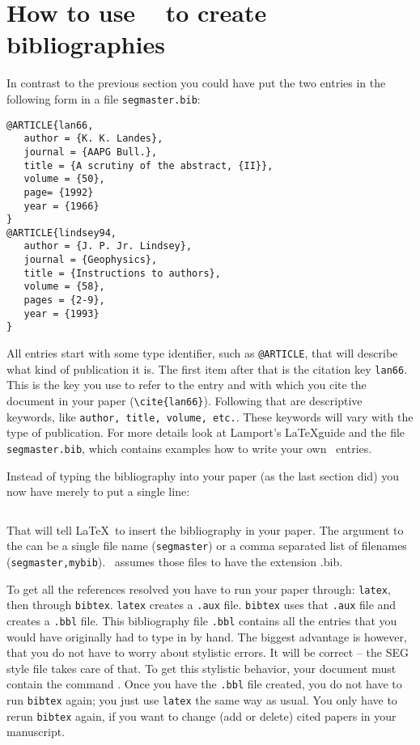 \section{How to use {{\BibTeX\ }} to create bibliographies}

In contrast to the previous section you could have put the two entries
in the following form in a file {\tt segmaster.bib}:
{\tighten
\begin{verbatim}
@ARTICLE{lan66,
   author = {K. K. Landes},
   journal = {AAPG Bull.},
   title = {A scrutiny of the abstract, {II}},
   volume = {50},
   page= {1992}
   year = {1966}
}
@ARTICLE{lindsey94,
   author = {J. P. Jr. Lindsey},
   journal = {Geophysics},
   title = {Instructions to authors},
   volume = {58},
   pages = {2-9},
   year = {1993}
}
\end{verbatim}
}
All entries start with some type identifier, such as {\tt @ARTICLE}, that
will describe what kind of publication it is. The first item after that
is the citation key {\tt lan66}. This is the key you use to refer to the
entry and with which you cite the document in your paper (\verb+\cite{lan66}+).
Following that are descriptive keywords, like {\tt author, title, 
volume, etc.}.
These keywords will vary with the type of publication.
For more details look at Lamport's \LaTeX guide  and the
file {\tt segmaster.bib}, which contains examples how to write your own 
\BibTeX\ entries.

Instead of typing the bibliography into your paper (as the last section did)
you now have merely to put a single line:
{\bf
\begin{verbatim}

\end{verbatim}
}
That will tell \LaTeX\ to  insert the bibliography in your paper.
The argument to the {\bf \verb++} 
can be a single file name
({\tt segmaster}) or a comma separated list of 
filenames ({\tt segmaster,mybib}).
\BibTeX\  assumes those files to have the extension {.bib}.

To get all the references resolved  you have to run your paper through:
{\tt latex}, then through {\tt bibtex}. 
{\tt latex} creates a {\tt .aux} file.
{\tt bibtex} uses that {\tt .aux} file and creates a {\tt .bbl} file.
This bibliography file {\tt .bbl} contains all the entries that you would
have originally had to type in by hand.
The biggest advantage is however, that you do not have to worry about
stylistic errors. It will be correct -- the SEG style file takes care of that.
To get this stylistic behavior, your document must contain the command
{\bf\verb++}.
Once you have the {\tt .bbl} file created, 
you do not have to run {\tt bibtex} again; 
you just use {\tt latex} the same way as usual.
%
You only have to rerun {\tt bibtex} again, 
if you want to change (add or delete) cited papers in your manuscript.


